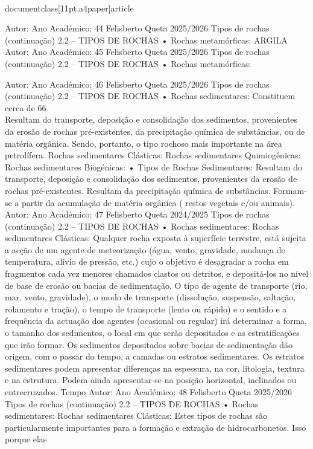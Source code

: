\\documentclass[11pt,a4paper]{article}
\begin{document}
Autor:
Ano Académico:
44
Felisberto Queta
2025/2026
Tipos de rochas (continuação)
2.2 – TIPOS DE ROCHAS
• Rochas metamórficas:
ARGILA
Autor:
Ano Académico:
45
Felisberto Queta
2025/2026
Tipos de rochas (continuação)
2.2 – TIPOS DE ROCHAS
• Rochas metamórficas:\

Autor:
Ano Académico:
46
Felisberto Queta
2025/2026
Tipos de rochas (continuação)
2.2 – TIPOS DE ROCHAS
• Rochas sedimentares: 
Constituem cerca de 66\\%
Resultam do transporte, deposição e consolidação dos sedimentos, provenientes da erosão de 
rochas pré-existentes, da precipitação química de substâncias, ou de matéria orgânica. Sendo, 
portanto, o tipo rochoso mais importante na área petrolífera. 
Rochas sedimentares 
Clásticas: 
Rochas sedimentares 
Quimiogênicas: 
Rochas sedimentares 
Biogénicas: 
• Tipos de Rochas Sedimentares: 
Resultam do transporte, deposição e consolidação dos sedimentos, 
provenientes da erosão de rochas pré-existentes.
Resultam da precipitação química de substâncias.
Formam-se a partir da acumulação de matéria orgânica ( restos vegetais 
e/ou animais).
Autor:
Ano Académico:
47
Felisberto Queta
2024/2025
Tipos de rochas (continuação)
2.2 – TIPOS DE ROCHAS
• Rochas sedimentares: Rochas sedimentares Clásticas: 
Qualquer rocha exposta à superfície terrestre, está sujeita a acção
de um agente de meteorização (água, vento, gravidade, mudança
de temperatura, alívio de pressão, etc.) cujo o objetivo é
desagradar a rocha em fragmentos cada vez menores chamados
clastos ou detritos, e depositá-los no nível de base de erosão ou
bacias de sedimentação.
O tipo de agente de transporte (rio, mar, vento, gravidade), o
modo de transporte (dissolução, suspensão, saltação, rolamento e
tração), o tempo de transporte (lento ou rápido) e o sentido e a
frequência da actuação dos agentes (ocasional ou regular) irá
determinar a forma, o tamanho dos sedimentos, o local em que
serão depositados e as estratificações que irão formar.
Os sedimentos depositados sobre bacias de sedimentação dão
origem, com o passar do tempo, a camadas ou estratos
sedimentares. Os estratos sedimentares podem apresentar
diferenças na espessura, na cor, litologia, textura e na estrutura.
Podem ainda apresentar-se na posição horizontal, inclinados ou
entrecruzados.
Tempo
Autor:
Ano Académico:
48
Felisberto Queta
2025/2026
Tipos de rochas (continuação)
2.2 – TIPOS DE ROCHAS
• Rochas sedimentares: Rochas sedimentares Clásticas: 
Estes tipos de rochas são particularmente importantes para a
formação e extração de hidrocarbonetos. Isso porque elas
\end{document}

